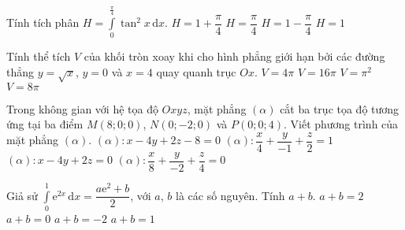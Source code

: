 \begin{ex}%
Tính tích phân $H=\displaystyle\int\limits_{0}^{\frac{\pi}{4}} \tan^2x\mathrm{\,d}x$.
\choice
{$H=1+\dfrac{\pi}{4}$}
{$H=\dfrac{\pi}{4}$}
{\True $H=1-\dfrac{\pi}{4}$}
{$H=1$}
\end{ex}

\begin{ex}%
Tính thể tích $V$ của khối tròn xoay khi cho hình phẳng giới hạn bởi các đường thẳng $y=\sqrt{x}$, $y=0$ và $x=4$ quay quanh trục $Ox$.
\choice
{$V=4\pi$}
{$V=16\pi$}
{$V=\pi^2$}
{\True $V=8\pi$}
\end{ex}

\begin{ex}%
Trong không gian với hệ tọa độ $Oxyz$, mặt phẳng $(\alpha)$ cắt ba trục tọa độ tương ứng tại ba điểm $M(8;0;0)$, $N(0;-2;0)$ và $P(0;0;4)$. Viết phương trình của mặt phẳng $(\alpha)$.
\choice
{$(\alpha)\colon x-4y+2z-8=0$}
{$(\alpha)\colon \dfrac{x}{4}+\dfrac{y}{-1}+\dfrac{z}{2}=1$}
{$(\alpha)\colon x-4y+2z=0$}
{\True $(\alpha)\colon \dfrac{x}{8}+\dfrac{y}{-2}+\dfrac{z}{4}=0$}
\end{ex}

\begin{ex}%
Giả sử $\displaystyle\int\limits_{0}^{1} \mathrm{e}^{2x}\mathrm{\,d}x=\dfrac{a\mathrm{e}^2+b}{2}$, với $a$, $b$ là các số nguyên. Tính $a+b$.
\choice
{$a+b=2$}
{\True $a+b=0$}
{$a+b=-2$}
{$a+b=1$}
\end{ex}

